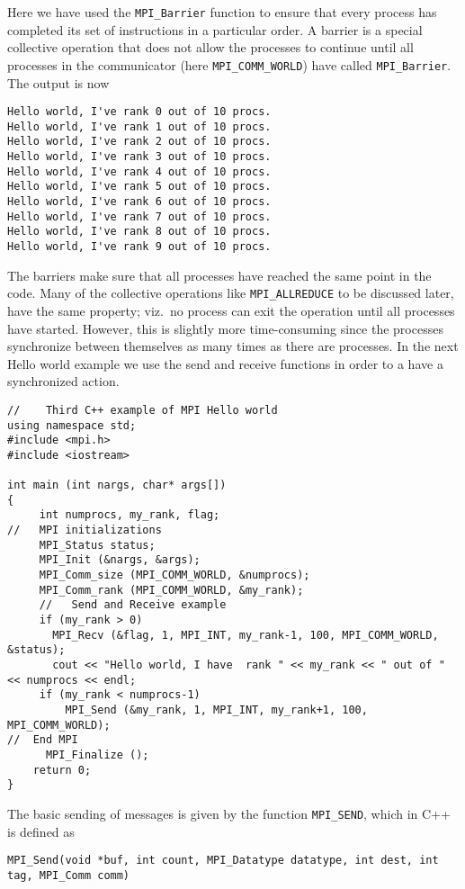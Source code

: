 Here we have used the \lstinline{MPI_Barrier} function to ensure that
every process has completed  its set of instructions in  a particular order.
A barrier is a special collective operation that does not allow the processes to continue
until all processes in the communicator (here \lstinline{MPI_COMM_WORLD}) have called 
\lstinline{MPI_Barrier}. 
The output is now
\begin{verbatim}
Hello world, I've rank 0 out of 10 procs.
Hello world, I've rank 1 out of 10 procs.
Hello world, I've rank 2 out of 10 procs.
Hello world, I've rank 3 out of 10 procs.
Hello world, I've rank 4 out of 10 procs.
Hello world, I've rank 5 out of 10 procs.
Hello world, I've rank 6 out of 10 procs.
Hello world, I've rank 7 out of 10 procs.
Hello world, I've rank 8 out of 10 procs.
Hello world, I've rank 9 out of 10 procs.
\end{verbatim}
The barriers make sure that all processes have reached the same point in the code. Many of the collective operations
like \lstinline{MPI_ALLREDUCE} to be discussed later, have the same property; viz.~no process can exit the operation
until all processes have started. 
However, this is slightly more time-consuming since the processes synchronize between themselves as many times as there
are processes.  In the next Hello world example we use the send and receive functions in order to a have a synchronized
action.
\lstset{language=c++}
\begin{lstlisting}[title={\url{http://folk.uio.no/mhjensen/compphys/programs/chapter04/program4.cpp}}]
//    Third C++ example of MPI Hello world
using namespace std;
#include <mpi.h>
#include <iostream>

int main (int nargs, char* args[])
{
     int numprocs, my_rank, flag;
//   MPI initializations
     MPI_Status status;
     MPI_Init (&nargs, &args);
     MPI_Comm_size (MPI_COMM_WORLD, &numprocs);
     MPI_Comm_rank (MPI_COMM_WORLD, &my_rank);
     //   Send and Receive example
     if (my_rank > 0)
       MPI_Recv (&flag, 1, MPI_INT, my_rank-1, 100, MPI_COMM_WORLD, &status);
       cout << "Hello world, I have  rank " << my_rank << " out of " << numprocs << endl;
     if (my_rank < numprocs-1)
         MPI_Send (&my_rank, 1, MPI_INT, my_rank+1, 100, MPI_COMM_WORLD);
//  End MPI
      MPI_Finalize ();
    return 0;
}
\end{lstlisting}
The basic sending of messages is given by the function \lstinline{MPI_SEND}, which in C++
is defined as 
\begin{lstlisting}
MPI_Send(void *buf, int count, MPI_Datatype datatype, int dest, int tag, MPI_Comm comm)
\end{lstlisting}
